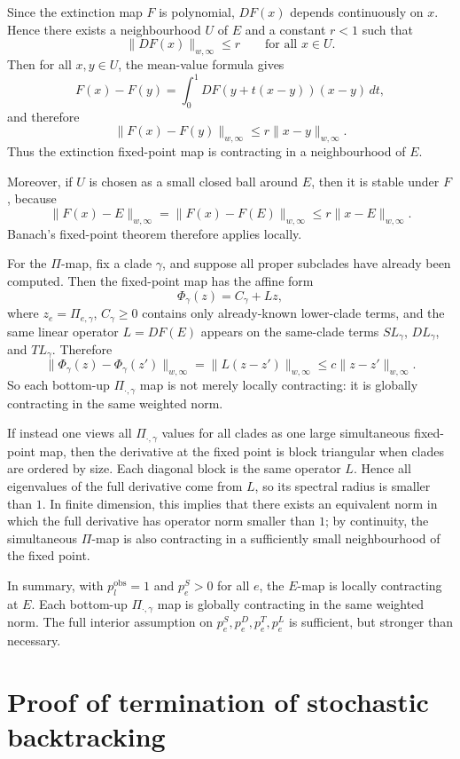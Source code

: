 \documentclass{article}
\newcommand{\1}{\mathbf{1}}
\begin{document}
Since the extinction map $F$ is polynomial, $DF(x)$ depends continuously on $x$. Hence there exists a neighbourhood $U$ of $E$ and a constant $r<1$ such that
\[
    \|DF(x)\|_{w,\infty}\le r
    \qquad\text{for all }x\in U.
\]
Then for all $x,y\in U$, the mean-value formula gives
\[
    F(x)-F(y)
    =
    \int_0^1 DF(y+t(x-y))(x-y)\,dt,
\]
and therefore
\[
    \|F(x)-F(y)\|_{w,\infty}
    \le r\|x-y\|_{w,\infty}.
\]
Thus the extinction fixed-point map is contracting in a neighbourhood of $E$.

Moreover, if $U$ is chosen as a small closed ball around $E$, then it is stable under $F$, because
\[
    \|F(x)-E\|_{w,\infty}
    =
    \|F(x)-F(E)\|_{w,\infty}
    \le r\|x-E\|_{w,\infty}.
\]
Banach's fixed-point theorem therefore applies locally.

For the $\Pi$-map, fix a clade $\gamma$, and suppose all proper subclades have already been computed. Then the fixed-point map has the affine form
\[
    \Phi_\gamma(z)=C_\gamma+Lz,
\]
where $z_e=\Pi_{e,\gamma}$, $C_\gamma\ge0$ contains only already-known lower-clade terms, and the same linear operator $L=DF(E)$ appears on the same-clade terms $SL_\gamma$, $DL_\gamma$, and $TL_\gamma$. Therefore
\[
    \|\Phi_\gamma(z)-\Phi_\gamma(z')\|_{w,\infty}
    =
    \|L(z-z')\|_{w,\infty}
    \le c\|z-z'\|_{w,\infty}.
\]
So each bottom-up $\Pi_{\cdot,\gamma}$ map is not merely locally contracting: it is globally contracting in the same weighted norm.

If instead one views all $\Pi_{\cdot,\gamma}$ values for all clades as one large simultaneous fixed-point map, then the derivative at the fixed point is block triangular when clades are ordered by size. Each diagonal block is the same operator $L$. Hence all eigenvalues of the full derivative come from $L$, so its spectral radius is smaller than $1$. In finite dimension, this implies that there exists an equivalent norm in which the full derivative has operator norm smaller than $1$; by continuity, the simultaneous $\Pi$-map is also contracting in a sufficiently small neighbourhood of the fixed point.

In summary, with $p_l^{\mathrm{obs}}=1$ and $p_e^S>0$ for all $e$, the $E$-map is locally contracting at $E$. Each bottom-up $\Pi_{\cdot,\gamma}$ map is globally contracting in the same weighted norm. The full interior assumption on $p_e^S,p_e^D,p_e^T,p_e^L$ is sufficient, but stronger than necessary.

\section{Proof of termination of stochastic backtracking}
\end{document}
